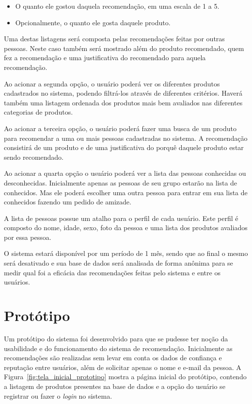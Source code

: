 \begin{itemize}
	\item O quanto ele gostou daquela recomendação, em uma escala de 1 a 5.
	\item Opcionalmente, o quanto ele gosta daquele produto.
\end{itemize}

 Uma destas listagens será composta pelas recomendações feitas por outras pessoas. Neste caso também será mostrado além do produto recomendado, quem fez a recomendação e uma justificativa do recomendado para aquela recomendação.

 Ao acionar a segunda opção, o usuário poderá ver os diferentes produtos cadastrados no sistema, podendo filtrá-los através de diferentes critérios. Haverá também uma listagem ordenada dos produtos mais bem avaliados nas diferentes categorias de produtos.

 Ao acionar a terceira opção, o usuário poderá fazer uma busca de um produto para recomendar a uma ou mais pessoas cadastradas no sistema. A recomendação consistirá de um produto e de uma justificativa do porquê daquele produto estar sendo recomendado.

 Ao acionar a quarta opção o usuário poderá ver a lista das pessoas conhecidas ou desconhecidas. Inicialmente apenas as pessoas de seu grupo estarão na lista de conhecidos. Mas ele poderá escolher uma outra pessoa para entrar em sua lista de conhecidos fazendo um pedido de amizade.

 A lista de pessoas possue um atalho para o perfil de cada usuário. Este perfil é composto do nome, idade, sexo, foto da pessoa e uma lista dos produtos avaliados por essa pessoa.

 O sistema estará disponível por um período de 1 mês, sendo que ao final o mesmo será desativado e sua base de dados será analisada de forma anônima para se medir qual foi a eficácia das recomendações feitas pelo sistema e entre os usuários.

\section{Protótipo}
\label{cha:prototipo}

 Um protótipo do sistema foi desenvolvido para que se pudesse ter noção da usabilidade e do funcionamento do sistema de recomendação. Inicialmente as recomendações são realizadas sem levar em conta os dados de confiança e reputação entre usuários, além de solicitar apenas o nome e e-mail da pessoa. A Figura~\ref{fig:tela_inicial_prototipo} mostra a página inicial do protótipo, contendo a listagem de produtos presentes na base de dados e a opção do usuário se registrar ou  fazer o \textit{login} no sistema.
 
